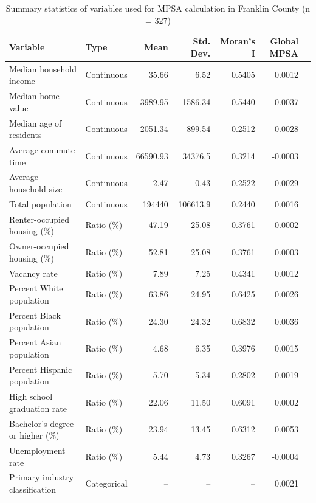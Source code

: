 \documentclass[
  a4paper,
  12pt]{article}
\begin{document}
\renewcommand{\arraystretch}{0.9}
\begin{table}[H]
\centering
\caption{Summary statistics of variables used for MPSA calculation in Franklin County (n = 327)}
\small
\begin{tabular}{lp{2.5cm}rrrrr}
\toprule
\textbf{Variable} & \textbf{Type} & \textbf{Mean} & \textbf{Std. Dev.} & \textbf{Moran's I} & \textbf{Global MPSA} \\
\midrule
Median household income            & Continuous  & 35.66    & 6.52     & 0.5405 & 0.0012 \\
Median home value                  & Continuous  & 3989.95  & 1586.34  & 0.5440 & 0.0037 \\
Median age of residents            & Continuous  & 2051.34  & 899.54   & 0.2512 & 0.0028 \\
Average commute time              & Continuous  & 66590.93 & 34376.5  & 0.3214 & -0.0003 \\
Average household size            & Continuous  & 2.47     & 0.43     & 0.2522 & 0.0029 \\
Total population                  & Continuous  & 194440   & 106613.9 & 0.2440 & 0.0016 \\
Renter-occupied housing (\%)      & Ratio (\%)  & 47.19    & 25.08    & 0.3761 & 0.0002 \\
Owner-occupied housing (\%)       & Ratio (\%)  & 52.81    & 25.08    & 0.3761 & 0.0003 \\
Vacancy rate                      & Ratio (\%)  & 7.89     & 7.25     & 0.4341 & 0.0012 \\
Percent White population          & Ratio (\%)  & 63.86    & 24.95    & 0.6425 & 0.0026 \\
Percent Black population          & Ratio (\%)  & 24.30    & 24.32    & 0.6832 & 0.0036 \\
Percent Asian population          & Ratio (\%)  & 4.68     & 6.35     & 0.3976 & 0.0015 \\
Percent Hispanic population       & Ratio (\%)  & 5.70     & 5.34     & 0.2802 & -0.0019 \\
High school graduation rate       & Ratio (\%)  & 22.06    & 11.50    & 0.6091 & 0.0002 \\
Bachelor’s degree or higher (\%) & Ratio (\%)  & 23.94    & 13.45    & 0.6312 & 0.0053 \\
Unemployment rate                 & Ratio (\%)  & 5.44     & 4.73     & 0.3267 & -0.0004 \\
Primary industry classification   & Categorical & --       & --       & --     & 0.0021 \\
\bottomrule
\end{tabular}
\label{tab:franklin_vars}
\end{table}
\end{document}
